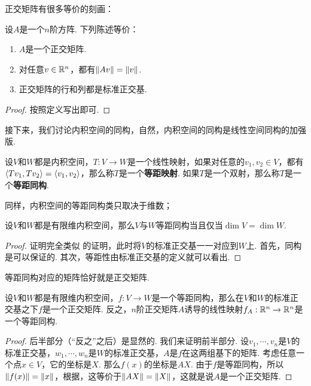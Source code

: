 正交矩阵有很多等价的刻画：

\begin{proposition}\label{prop:orthogonal-matrix}
设$A$是一个$n$阶方阵. 下列陈述等价：
\begin{enumerate}
    \item $A$是一个正交矩阵.
    \item 对任意$v\in\mathbb{R}^n$，都有$\left\|Av\right\|=\left\|v\right\|$. 
    \item 正交矩阵的行和列都是标准正交基.
\end{enumerate}
\end{proposition}
\begin{proof}
    按照定义写出即可. 
\end{proof}

接下来，我们讨论内积空间的同构，自然，内积空间的同构是线性空间同构的加强版. 

\begin{definition}[等距映射与等距同构]\label{def:isometry}
设$V$和$W$都是内积空间，$T:V\to W$是一个线性映射，如果对任意的$v_1,v_2\in V$，都有$\left\langle{Tv_1},{Tv_2}\right\rangle=\left\langle{v_1},{v_2}\right\rangle$，那么称$T$是一个\textbf{等距映射}. 如果$T$是一个双射，那么称$T$是一个\textbf{等距同构}.
\end{definition}

同样，内积空间的等距同构类只取决于维数；

\begin{theorem}\label{thm:isometry}
设$V$和$W$都是有限维内积空间，那么$V$与$W$等距同构当且仅当$\dim V=\dim W$. 
\end{theorem}
\begin{proof}
    证明完全类似 的证明，此时将$V$的标准正交基一一对应到$W$上. 首先，同构是可以保证的. 其次，等距性由标准正交基的定义就可以看出. 
\end{proof}

等距同构对应的矩阵恰好就是正交矩阵. 
\begin{proposition}\label{prop:isometry-matrix}
设$V$和$W$都是有限维内积空间，$f:V\to W$是一个等距同构，那么在$V$和$W$的标准正交基之下$f$是一个正交矩阵. 反之，$n$阶正交矩阵$A$诱导的线性映射$f_A:\mathbb{R}^n\to\mathbb{R}^n$是一个等距同构. 
\end{proposition}
\begin{proof}
    后半部分（“反之”之后）是显然的. 我们来证明前半部分. 设$v_1,\cdots,v_n$是$V$的标准正交基，$w_1,\cdots,w_n$是$W$的标准正交基，$A$是$f$在这两组基下的矩阵. 考虑任意一个点$x\in V$，它的坐标是$X$. 那么$f(x)$的坐标是$AX$. 由于$f$是等距同构，所以$\left\|f(x)\right\|=\left\|x\right\|$，根据，这等价于$\left\|AX\right\|=\left\|X\right\|$，这就是说$A$是一个正交矩阵. 
\end{proof}


